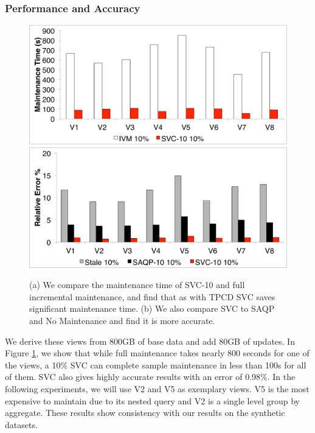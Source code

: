 \subsubsection{Performance and Accuracy}
\begin{figure}[t]
\centering
 \includegraphics[scale=0.14]{exp/con_2.pdf}
 \includegraphics[scale=0.14]{exp/con_1.pdf}
 \caption{(a) We compare the maintenance time of SVC-10 and full incremental maintenance, and find that as with TPCD SVC saves significant maintenance time. (b) We also compare SVC to SAQP and No Maintenance and find it is more accurate. \label{conv-1}}
\end{figure}
We derive these views from 800GB of base data and add 80GB of updates.
In Figure \ref{conv-1}, we show that while full maintenance takes nearly 800 seconds for one of the views, a 10\% SVC can complete sample maintenance in less than 100s for all of them.
SVC also gives highly accurate results with an error of 0.98\%.
In the following experiments, we will use V2 and V5 as exemplary views.
V5 is the most expensive to maintain due to its nested query and V2 is a single level group by aggregate.
These results show consistency with our results on the synthetic datasets.

